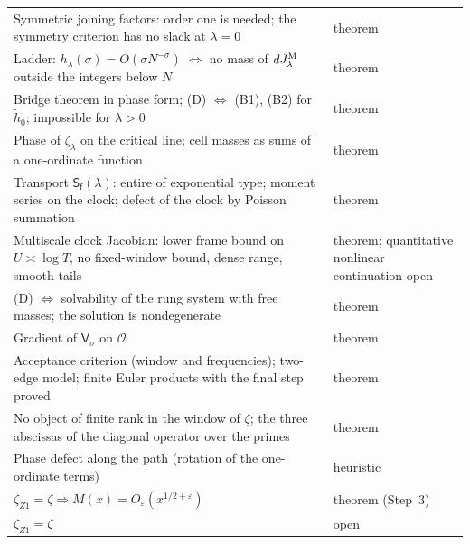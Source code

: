 \documentclass[11pt,reqno]{amsart}
\numberwithin{equation}{section}
\theoremstyle{plain}
\theoremstyle{definition}
\theoremstyle{remark}
\newcommand{\eps}{\varepsilon}
\begin{document}
\begin{longtable}{p{}p{}}
Symmetric joining factors: order one is needed; the symmetry criterion has no slack at $\lambda=0$ & theorem\\
Ladder: $\tilde h_\lambda(\sigma)=O(\sigma N^{-\sigma})$ $\Leftrightarrow$ no mass of $dJ^{\rm M}_\lambda$ outside the integers below $N$ & theorem\\
Bridge theorem in phase form; (D) $\Leftrightarrow$ \textup{(B1)}, \textup{(B2)} for $\tilde h_0$; impossible for $\lambda>0$ & theorem\\
Phase of $\zeta_\lambda$ on the critical line; cell masses as sums of a one-ordinate function & theorem\\
Transport $\mathsf S_{\mathsf f}(\lambda)$: entire of exponential type; moment series on the clock; defect of the clock by Poisson summation & theorem\\
Multiscale clock Jacobian: lower frame bound on $U\asymp\log T$, no fixed-window bound, dense range, smooth tails & theorem; quantitative nonlinear continuation open\\
(D) $\Leftrightarrow$ solvability of the rung system with free masses; the solution is nondegenerate & theorem\\
Gradient of $\mathsf V_\sigma$ on $\mathscr O$ & theorem\\
Acceptance criterion (window and frequencies); two-edge model; finite Euler products with the final step proved & theorem\\
No object of finite rank in the window of $\zeta$; the three abscissas of the diagonal operator over the primes & theorem\\
Phase defect along the path (rotation of the one-ordinate terms) & heuristic\\
$\zeta_{Z1}=\zeta\Rightarrow M(x)=O_\eps(x^{1/2+\eps})$ & theorem (Step~3)\\
$\zeta_{Z1}=\zeta$ & open\\
\end{longtable}
\endgroup
\end{document}
